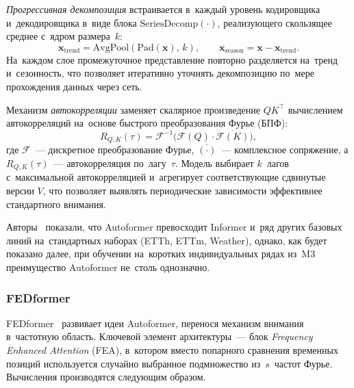 \textit{Прогрессивная декомпозиция} встраивается в~каждый уровень
кодировщика и~декодировщика в~виде блока
$\mathrm{SeriesDecomp}(\cdot)$, реализующего скользящее среднее
с~ядром размера~$k$:
\begin{equation}
\label{eq:autoformer-decomp}
\mathbf{x}_{\mathrm{trend}} = \mathrm{AvgPool}(\mathrm{Pad}(\mathbf{x}),\, k),
\qquad
\mathbf{x}_{\mathrm{season}} = \mathbf{x} - \mathbf{x}_{\mathrm{trend}}.
\end{equation}
На~каждом слое промежуточное представление повторно разделяется на~тренд
и~сезонность, что позволяет итеративно уточнять декомпозицию по~мере
прохождения данных через сеть.

Механизм \textit{автокорреляции} заменяет скалярное
произведение $QK^\top$ вычислением автокорреляций на~основе быстрого
преобразования Фурье (БПФ):
\begin{equation}
\label{eq:autocorrelation}
R_{Q,K}(\tau) = \mathcal{F}^{-1}\bigl(\mathcal{F}(Q) \cdot \overline{\mathcal{F}(K)}\bigr),
\end{equation}
где $\mathcal{F}$~--- дискретное преобразование Фурье, $\overline{(\cdot)}$~---
комплексное сопряжение, а $R_{Q,K}(\tau)$~--- автокорреляция по~лагу~$\tau$.
Модель выбирает $k$~лагов с~максимальной автокорреляцией и~агрегирует
соответствующие сдвинутые версии $V$, что позволяет выявлять
периодические зависимости эффективнее стандартного внимания.

Авторы~\cite{wu2021autoformer} показали, что Autoformer превосходит
Informer и~ряд других базовых линий на~стандартных наборах (ETTh, ETTm,
Weather), однако, как будет показано далее, при обучении на~коротких
индивидуальных рядах из~M3 преимущество Autoformer не~столь однозначно.


\subsubsection{FEDformer}
\label{sssec:fedformer}

FEDformer~\cite{zhou2022fedformer} развивает идеи Autoformer,
перенося механизм внимания в~частотную область.  Ключевой элемент
архитектуры~--- блок \textit{Frequency Enhanced Attention} (FEA),
в~котором вместо попарного сравнения временных позиций используется
случайно выбранное подмножество из~$s$~частот Фурье.  Вычисления
производятся следующим образом.


